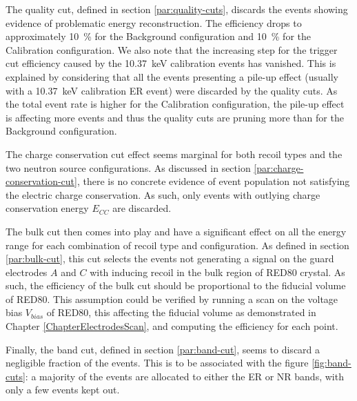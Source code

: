 The quality cut, defined in section \ref{par:quality-cuts}, discards the events showing evidence of problematic energy reconstruction. The efficiency drops to approximately \SI{10}{\percent} for the Background configuration and \SI{10}{\percent} for the Calibration configuration. We also note that the increasing step for the trigger cut efficiency caused by the \SI{10.37}{\kilo\eV} calibration events has vanished. This is explained by considering that all the events presenting a pile-up effect (usually with a \SI{10.37}{\kilo\eV} calibration ER event) were discarded by the quality cuts. As the total event rate is higher for the Calibration configuration, the pile-up effect is affecting more events and thus the quality cuts are pruning more than for the Background configuration.

The charge conservation cut effect seems marginal for both recoil types and the two neutron source configurations. As discussed in section \ref{par:charge-conservation-cut}, there is no concrete evidence of event population not satisfying the electric charge conservation. As such, only events with outlying charge conservation energy $E_{CC}$ are discarded.


The bulk cut then comes into play and have a significant effect on all the energy range for each combination of recoil type and configuration. As defined in section \ref{par:bulk-cut}, this cut selects the events not generating a signal on the guard electrodes $A$ and $C$ with inducing recoil in the bulk region of RED80 crystal. As such, the efficiency of the bulk cut should be proportional to the fiducial volume of RED80. This assumption could be verified by running a scan on the voltage bias $V_{bias}$ of RED80, this affecting the fiducial volume as demonstrated in Chapter \ref{ChapterElectrodesScan}, and computing the efficiency for each point.

Finally, the band cut, defined in section \ref{par:band-cut}, seems to discard a negligible fraction of the events. This is to be associated with the figure \ref{fig:band-cuts}: a majority of the events are allocated to either the ER or NR bands, with only a few events kept out.


